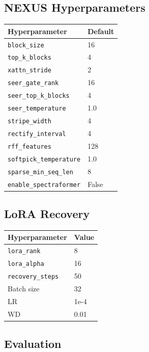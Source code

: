 \subsection{NEXUS Hyperparameters}

\begin{table}[H]
\centering
\small
\begin{tabular}{ll}
\toprule
\textbf{Hyperparameter} & \textbf{Default} \\
\midrule
\texttt{block\_size} & 16 \\
\texttt{top\_k\_blocks} & 4 \\
\texttt{xattn\_stride} & 2 \\
\texttt{seer\_gate\_rank} & 16 \\
\texttt{seer\_top\_k\_blocks} & 4 \\
\texttt{seer\_temperature} & 1.0 \\
\texttt{stripe\_width} & 4 \\
\texttt{rectify\_interval} & 4 \\
\texttt{rff\_features} & 128 \\
\texttt{softpick\_temperature} & 1.0 \\
\texttt{sparse\_min\_seq\_len} & 8 \\
\texttt{enable\_spectraformer} & False \\
\bottomrule
\end{tabular}
\end{table}

\subsection{LoRA Recovery}

\begin{table}[H]
\centering
\small
\begin{tabular}{ll}
\toprule
\textbf{Hyperparameter} & \textbf{Value} \\
\midrule
\texttt{lora\_rank} & 8 \\
\texttt{lora\_alpha} & 16 \\
\texttt{recovery\_steps} & 50 \\
Batch size & 32 \\
LR & 1e-4 \\
WD & 0.01 \\
\bottomrule
\end{tabular}
\end{table}

\subsection{Evaluation}

